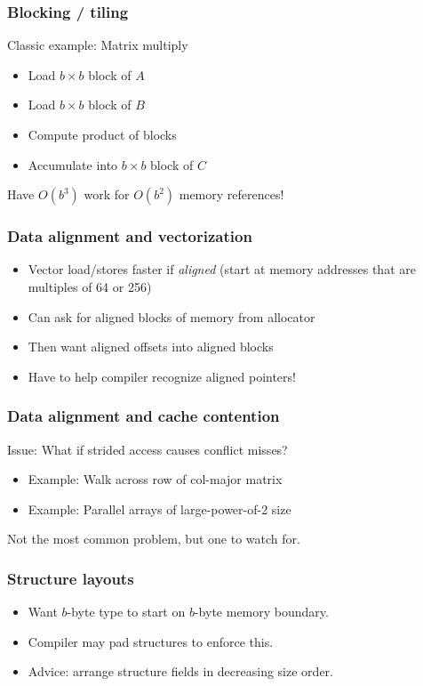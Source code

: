 \documentclass{beamer}
\begin{document}
\begin{frame}
  \frametitle{Blocking / tiling}

  Classic example: Matrix multiply
  \begin{itemize}
  \item Load $b \times b$ block of $A$
  \item Load $b \times b$ block of $B$
  \item Compute product of blocks
  \item Accumulate into $b \times b$ block of $C$
  \end{itemize}
  Have $O(b^3)$ work for $O(b^2)$ memory references!
\end{frame}


\begin{frame}
  \frametitle{Data alignment and vectorization}

  \begin{itemize}
  \item Vector load/stores faster if {\em aligned} (start at memory
    addresses that are multiples of 64 or 256)
  \item Can ask for aligned blocks of memory from allocator
  \item Then want aligned offsets into aligned blocks
  \item Have to help compiler recognize aligned pointers!
  \end{itemize}
\end{frame}


\begin{frame}
  \frametitle{Data alignment and cache contention}

  Issue: What if strided access causes conflict misses?
  \begin{itemize}
  \item Example: Walk across row of col-major matrix
  \item Example: Parallel arrays of large-power-of-2 size
  \end{itemize}
  Not the most common problem, but one to watch for.
  
\end{frame}


\begin{frame}[fragile]
  \frametitle{Structure layouts}

  \begin{itemize}
  \item Want $b$-byte type to start on $b$-byte memory boundary.
  \item Compiler may pad structures to enforce this.
  \item Advice: arrange structure fields in decreasing size order.
  \end{itemize}
\end{frame}
\end{document}
